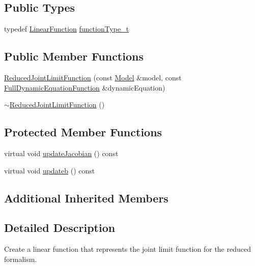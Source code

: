 \subsection*{Public Types}
\begin{DoxyCompactItemize}
\item 
typedef \hyperlink{classocra_1_1LinearFunction}{Linear\+Function} \hyperlink{classocra_1_1ReducedJointLimitFunction_a899e4871502f5e5509349b1f8eb5dfa8}{function\+Type\+\_\+t}
\end{DoxyCompactItemize}
\subsection*{Public Member Functions}
\begin{DoxyCompactItemize}
\item 
\hyperlink{classocra_1_1ReducedJointLimitFunction_afe65f4b9229680de647bb06fd7ae5b44}{Reduced\+Joint\+Limit\+Function} (const \hyperlink{classocra_1_1Model}{Model} \&model, const \hyperlink{classocra_1_1FullDynamicEquationFunction}{Full\+Dynamic\+Equation\+Function} \&dynamic\+Equation)
\item 
\hyperlink{classocra_1_1ReducedJointLimitFunction_a96e9196a18c5eb5e92672b45a7491c65}{$\sim$\+Reduced\+Joint\+Limit\+Function} ()
\end{DoxyCompactItemize}
\subsection*{Protected Member Functions}
\begin{DoxyCompactItemize}
\item 
virtual void \hyperlink{classocra_1_1ReducedJointLimitFunction_a827923145070c4c8a57d76ceb4a3a5d0}{update\+Jacobian} () const 
\item 
virtual void \hyperlink{classocra_1_1ReducedJointLimitFunction_a8f6321dbce284d9639a1a27558085a46}{updateb} () const 
\end{DoxyCompactItemize}
\subsection*{Additional Inherited Members}


\subsection{Detailed Description}
Create a linear function that represents the joint limit function for the reduced formalism. 

